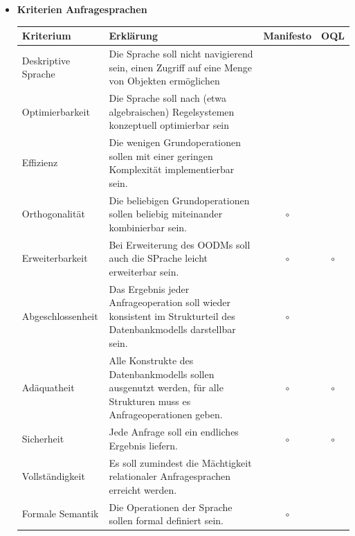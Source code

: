 \begin{itemize}
	\item \textbf{Kriterien Anfragesprachen}
	\begin{table}[!h]
		\centering
		\begin{tabular}{|l|p{20em}|c|c|}
			\hline
			\textbf{Kriterium}	& \textbf{Erklärung} & \textbf{Manifesto} & \textbf{OQL}\\
			\hline
			\hline
			Deskriptive Sprache & Die Sprache soll nicht navigierend sein, einen Zugriff auf eine Menge von Objekten ermöglichen & \checkmark & \checkmark\\
			\hline
			Optimierbarkeit & Die Sprache soll nach (etwa algebraischen) Regelsystemen konzeptuell optimierbar sein & \checkmark & \checkmark\\
			\hline
			Effizienz & Die wenigen Grundoperationen sollen mit einer geringen Komplexität implementierbar sein. & \checkmark & \checkmark\\
			\hline
			Orthogonalität & Die beliebigen Grundoperationen sollen beliebig miteinander kombinierbar sein. & $\circ$ & \checkmark\\
			\hline
			Erweiterbarkeit & Bei Erweiterung des OODMs soll auch die SPrache leicht erweiterbar sein. & $\circ$ & $\circ$\\
			\hline
			Abgeschlossenheit & Das Ergebnis jeder Anfrageoperation soll wieder konsistent im Strukturteil des Datenbankmodells darstellbar sein. & $\circ$ & \checkmark\\
			\hline
			Adäquatheit & Alle Konstrukte des Datenbankmodells sollen ausgenutzt werden, für alle Strukturen muss es Anfrageoperationen geben. & $\circ$ & $\circ$\\
			\hline
			Sicherheit & Jede Anfrage soll ein endliches Ergebnis liefern. & $\circ$ & $\circ$\\
			\hline
			Vollständigkeit & Es soll zumindest die Mächtigkeit relationaler Anfragesprachen erreicht werden. & \checkmark & \checkmark\\
			\hline
			Formale Semantik & Die Operationen der Sprache sollen formal definiert sein. & $\circ$ & \checkmark\\
			\hline
		\end{tabular}
	\end{table}
	

\end{itemize}
